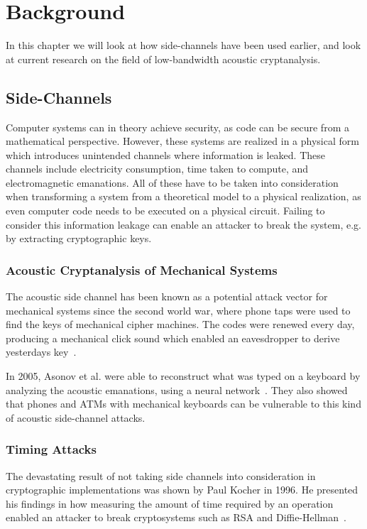 \chapter{Background}\label{chp:background} 
In this chapter we will look at how side-channels have been used earlier, and look at current research on the field of low-bandwidth acoustic cryptanalysis.


\section{Side-Channels}\label{chp2:sec:side_channel}
Computer systems can in theory achieve security, as code can be secure from a mathematical perspective.
However, these systems are realized in a physical form which introduces unintended channels where information is leaked.
These channels include electricity consumption, time taken to compute, and electromagnetic emanations. 
All of these have to be taken into consideration when transforming a system from a theoretical model to a physical realization, as even computer code needs to be executed on a physical circuit.
Failing to consider this information leakage can enable an attacker to break the system, e.g. by extracting cryptographic keys.

\subsection{Acoustic Cryptanalysis of Mechanical Systems}\label{chp2:subsec:acoustic_cryptanalysis}
The acoustic side channel has been known as a potential attack vector for mechanical systems since the second world war, where phone taps were used to find the keys of mechanical cipher machines. 
The codes were renewed every day, producing a mechanical click sound which enabled an eavesdropper to derive yesterdays key~\cite[pp. 103-107]{wright1988spycatcher}.

In 2005, Asonov et al. were able to reconstruct what was typed on a keyboard by analyzing the acoustic emanations, using a neural network~\cite{DBLP:conf/sp/AsonovA04}. 
They also showed that phones and ATMs with mechanical keyboards can be vulnerable to this kind of acoustic side-channel attacks.

\subsection{Timing Attacks}\label{chp2:subsec:timing_attacks}
The devastating result of not taking side channels into consideration in cryptographic implementations was shown by Paul Kocher in 1996. 
He presented his findings in how measuring the amount of time required by an operation enabled an attacker to break cryptosystems such as RSA and Diffie-Hellman~\cite{DBLP:conf/crypto/Kocher96}.

